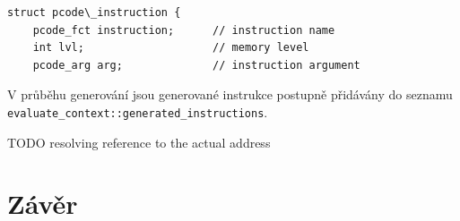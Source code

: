 \documentclass[12pt, a4paper]{article}
\let\oldsection\section
\renewcommand\section{\clearpage\oldsection}
\begin{document}
\begin{lstlisting}[caption={Struktura \texttt{ast\_node}}, captionpos=b]
struct pcode\_instruction {
    pcode_fct instruction;      // instruction name
    int lvl;                    // memory level
    pcode_arg arg;              // instruction argument
\end{lstlisting}
V průběhu generování jsou generované instrukce postupně přidávány do seznamu \texttt{evaluate\_context::generated\_instructions}. \begin{huge}TODO resolving reference to the actual address \end{huge}

\section{Závěr}	

\end{document}
